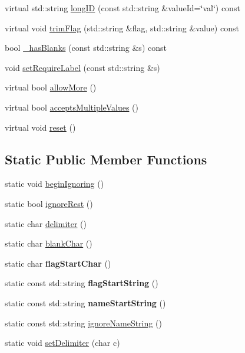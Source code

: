\begin{DoxyCompactItemize}
\item 
virtual std\+::string \hyperlink{class_t_c_l_a_p_1_1_arg_aad93aff46e1fc67e3853765f565bfa96}{long\+I\+D} (const std\+::string \&value\+Id=\char`\"{}val\char`\"{}) const 
\item 
virtual void \hyperlink{class_t_c_l_a_p_1_1_arg_a54595328e81f5fb77859563690faab25}{trim\+Flag} (std\+::string \&flag, std\+::string \&value) const 
\item 
bool \hyperlink{class_t_c_l_a_p_1_1_arg_a2eb0ffefe163218bdc8b4b7a33a974a7}{\+\_\+has\+Blanks} (const std\+::string \&s) const 
\item 
void \hyperlink{class_t_c_l_a_p_1_1_arg_aae5c959f31af1a484a8af06f84a6e8b0}{set\+Require\+Label} (const std\+::string \&s)
\item 
virtual bool \hyperlink{class_t_c_l_a_p_1_1_arg_a9aef735d37ef95ca1b7dc7a07850b984}{allow\+More} ()
\item 
virtual bool \hyperlink{class_t_c_l_a_p_1_1_arg_ad356870538a255d639e26b30330202ae}{accepts\+Multiple\+Values} ()
\item 
virtual void \hyperlink{class_t_c_l_a_p_1_1_arg_ab5b5dc9a9b0381561f0684523f943a2c}{reset} ()
\end{DoxyCompactItemize}
\subsection*{Static Public Member Functions}
\begin{DoxyCompactItemize}
\item 
static void \hyperlink{class_t_c_l_a_p_1_1_arg_a24165d31c1ec70777fb201356b6cdf6a}{begin\+Ignoring} ()
\item 
static bool \hyperlink{class_t_c_l_a_p_1_1_arg_a4d412155b8f9b4956e64e91c48e55a3b}{ignore\+Rest} ()
\item 
static char \hyperlink{class_t_c_l_a_p_1_1_arg_aadef6ca7e40f5b3d3fd03186976aea7e}{delimiter} ()
\item 
static char \hyperlink{class_t_c_l_a_p_1_1_arg_a0abd38f46dbf7d267078134a4817fbb2}{blank\+Char} ()
\item 
\hypertarget{class_t_c_l_a_p_1_1_arg_a7f9f6af439993e9151bd5a6cd2a63dad}{static char {\bfseries flag\+Start\+Char} ()}\label{class_t_c_l_a_p_1_1_arg_a7f9f6af439993e9151bd5a6cd2a63dad}

\item 
\hypertarget{class_t_c_l_a_p_1_1_arg_af8e739295b0f75028e7bff6d670d97a1}{static const std\+::string {\bfseries flag\+Start\+String} ()}\label{class_t_c_l_a_p_1_1_arg_af8e739295b0f75028e7bff6d670d97a1}

\item 
\hypertarget{class_t_c_l_a_p_1_1_arg_a1df2134870528b80f9f35347fef6fd14}{static const std\+::string {\bfseries name\+Start\+String} ()}\label{class_t_c_l_a_p_1_1_arg_a1df2134870528b80f9f35347fef6fd14}

\item 
static const std\+::string \hyperlink{class_t_c_l_a_p_1_1_arg_a6ce0cbe4effd44679ca11f25e3c318e7}{ignore\+Name\+String} ()
\item 
static void \hyperlink{class_t_c_l_a_p_1_1_arg_ad059b63424001b9aedb4c019e2854c3c}{set\+Delimiter} (char c)
\end{DoxyCompactItemize}
